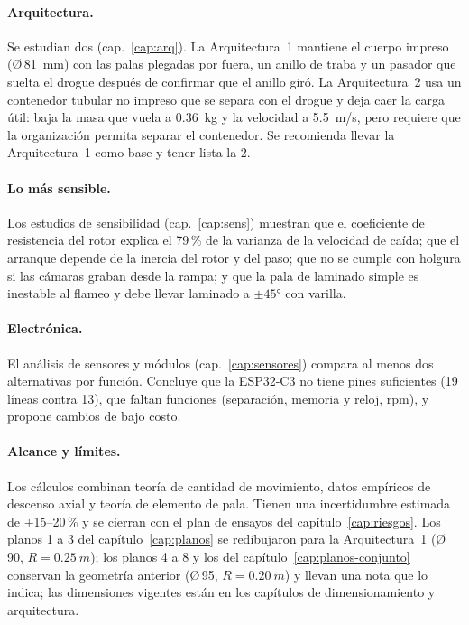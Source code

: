 \paragraph{Arquitectura.} Se estudian dos (cap.~\ref{cap:arq}). La Arquitectura~1 mantiene el
cuerpo impreso (Ø\,\SI{81}{mm}) con las palas plegadas por fuera, un anillo de traba y un
pasador que suelta el drogue después de confirmar que el anillo giró. La Arquitectura~2 usa
un contenedor tubular no impreso que se separa con el drogue y deja caer la carga útil: baja
la masa que vuela a \SI{0.36}{kg} y la velocidad a \SI{5.5}{m/s}, pero requiere que la
organización permita separar el contenedor. Se recomienda llevar la Arquitectura~1 como base
y tener lista la 2.

\paragraph{Lo más sensible.} Los estudios de sensibilidad (cap.~\ref{cap:sens}) muestran que
el coeficiente de resistencia del rotor explica el 79\,\% de la varianza de la velocidad
de caída; que el arranque depende de la inercia del rotor y del paso; que  no se
cumple con holgura si las cámaras graban desde la rampa; y que la pala de laminado simple
es inestable al flameo y debe llevar laminado a $\pm\ang{45}$ con varilla.

\paragraph{Electrónica.} El análisis de sensores y módulos (cap.~\ref{cap:sensores}) compara
al menos dos alternativas por función. Concluye que la ESP32-C3 no tiene pines suficientes
(19 líneas contra 13), que faltan funciones (separación, memoria y reloj, rpm), y propone
cambios de bajo costo.

\paragraph{Alcance y límites.} Los cálculos combinan teoría de cantidad de movimiento,
datos empíricos de descenso axial y teoría de elemento de pala. Tienen una incertidumbre
estimada de $\pm$15--20\,\% y se cierran con el plan de ensayos del
capítulo~\ref{cap:riesgos}. Los planos 1 a 3 del capítulo~\ref{cap:planos} se redibujaron para la
Arquitectura~1 (Ø\,90, $R=\SI{0.25}{m}$); los planos 4 a 8 y los del capítulo~\ref{cap:planos-conjunto}
conservan la geometría anterior (Ø\,95, $R=\SI{0.20}{m}$) y llevan una nota que lo indica; las
dimensiones vigentes están en los capítulos de dimensionamiento y arquitectura.

